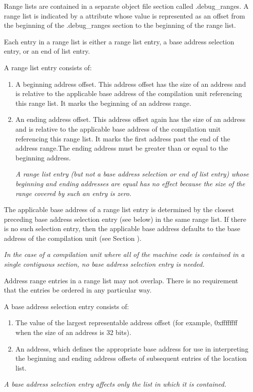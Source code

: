 Range lists are contained
in a separate object file section called .debug\_ranges. A
range list is indicated by a  attribute whose
value is represented as an offset from the beginning of the
.debug\_ranges section to the beginning of the range list.

Each entry in a range list is either a range list entry,
a base address selection entry, or an end of list entry.

A range list entry consists of:

\begin{enumerate}[1]
\item A beginning address offset. This address offset has the size of an address and is relative to
the applicable base address of the compilation unit referencing this range list. It marks the
beginning of an address range.

\item An ending address offset. This address offset again has the size of an address and is relative
to the applicable base address of the compilation unit referencing this range list. It marks the
first address past the end of the address range.The ending address must be greater than or
equal to the beginning address.

\textit{A range list entry (but not a base address selection or end of list entry) whose beginning and
ending addresses are equal has no effect because the size of the range covered by such an
entry is zero.}
\end{enumerate}

The applicable base address of a range list entry is determined
by the closest preceding base address selection entry (see
below) in the same range list. If there is no such selection
entry, then the applicable base address defaults to the base
address of the compilation unit 
(see Section ).

\textit{In the case of a compilation unit where all of the machine
code is contained in a single contiguous section, no base
address selection entry is needed.}

Address range entries in
a range list may not overlap. There is no requirement that
the entries be ordered in any particular way.

A base address selection entry consists of:

\begin{enumerate}[1]
\item The value of the largest representable address offset (for example, 0xffffffff when the size of
an address is 32 bits).

\item An address, which defines the appropriate base address for use in interpreting the beginning
and ending address offsets of subsequent entries of the location list.
\end{enumerate}
\textit{A base address selection entry 
affects only the list in which it is contained.}



